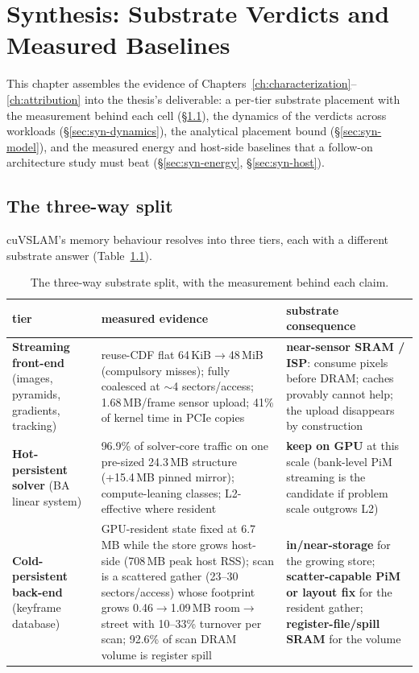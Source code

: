 \chapter{Synthesis: Substrate Verdicts and Measured Baselines}
\label{ch:synthesis}

This chapter assembles the evidence of
Chapters~\ref{ch:characterization}--\ref{ch:attribution} into the thesis's
deliverable: a per-tier substrate placement with the measurement behind
each cell (\S\ref{sec:syn-split}), the dynamics of the verdicts across
workloads (\S\ref{sec:syn-dynamics}), the analytical placement bound
(\S\ref{sec:syn-model}), and the measured energy and host-side baselines
that a follow-on architecture study must beat (\S\ref{sec:syn-energy},
\S\ref{sec:syn-host}).

\section{The three-way split}
\label{sec:syn-split}

cuVSLAM's memory behaviour resolves into three tiers, each with a different
substrate answer (Table~\ref{tab:split}).

\begin{table}[t]
\centering
\caption{The three-way substrate split, with the measurement behind each
claim.}
\label{tab:split}
\begin{tabular}{@{}p{}p{}p{}@{}}
\toprule
tier & measured evidence & substrate consequence \\
\midrule
\textbf{Streaming front-end} (images, pyramids, gradients, tracking) &
reuse-CDF flat 64\,KiB$\rightarrow$48\,MiB (compulsory misses); fully
coalesced at $\sim$4 sectors/access; 1.68\,MB/frame sensor upload; 41\% of
kernel time in PCIe copies &
\textbf{near-sensor SRAM / ISP}: consume pixels before DRAM; caches
provably cannot help; the upload disappears by construction \\
\addlinespace
\textbf{Hot-persistent solver} (BA linear system) &
96.9\% of solver-core traffic on one pre-sized 24.3\,MB structure
(+15.4\,MB pinned mirror); compute-leaning classes; L2-effective where
resident &
\textbf{keep on GPU} at this scale (bank-level PiM streaming is the
candidate if problem scale outgrows L2) \\
\addlinespace
\textbf{Cold-persistent back-end} (keyframe database) &
GPU-resident state fixed at 6.7\,MB while the store grows host-side
(708\,MB peak host RSS); scan is a scattered gather (23--30
sectors/access) whose footprint grows 0.46$\rightarrow$1.09\,MB
room$\rightarrow$street with 10--33\% turnover per scan; 92.6\% of scan
DRAM volume is register spill &
\textbf{in/near-storage} for the growing store; \textbf{scatter-capable
PiM or layout fix} for the resident gather; \textbf{register-file/spill
SRAM} for the volume \\
\bottomrule
\end{tabular}
\end{table}

